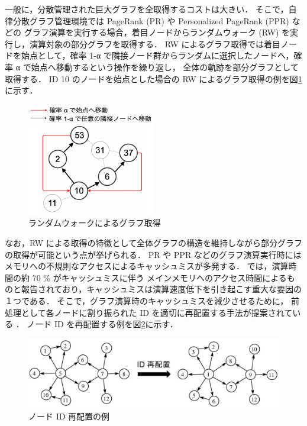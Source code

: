 一般に，分散管理された巨大グラフを全取得するコストは大きい．
そこで，自律分散グラフ管理環境では PageRank (PR) \cite{page1999pagerank} や Personalized PageRank (PPR) \cite{page1999pagerank} などの
グラフ演算を実行する場合，着目ノードからランダムウォーク (RW) を実行し，演算対象の部分グラフを取得する．
RW によるグラフ取得では着目ノードを始点として，確率 1-α で隣接ノード群からランダムに選択したノードへ，確率 α で始点へ移動するという操作を繰り返し，
全体の軌跡を部分グラフとして取得する．
ID 10 のノードを始点とした場合の RW によるグラフ取得の例を図\ref{RW_graph} に示す．
\begin{figure}[t]
  \centering
  \includegraphics[scale=1.8]{./figure/rw_graph_get.pdf}
  \caption{ランダムウォークによるグラフ取得}
  \label{RW_graph}
\end{figure}
なお，RW による取得の特徴として全体グラフの構造を維持しながら部分グラフの取得が可能という点が挙げられる．
PR や PPR などのグラフ演算実行時にはメモリへの不規則なアクセスによるキャッシュミスが多発する．
\cite{wei2016speedup,zhang2017making} では，演算時間の約 70 \% がキャッシュミスに伴う
メインメモリへのアクセス時間によるものと報告されており，キャッシュミスは演算速度低下を引き起こす重大な要因の１つである．
そこで，グラフ演算時のキャッシュミスを減少させるために，
前処理として各ノードに割り振られた ID を適切に再配置する手法が提案されている \cite{wei2016speedup,zhang2017making,balaji2018graph,arai2016rabbit,lakhotia2017recall,faldu2019closer}．
ノード ID を再配置する例を図\ref{reordering_intro}に示す．
\begin{figure}[t]
  \centering
  \includegraphics[width=\linewidth]{./figure/reordering_intro.pdf}
  \caption{ノード ID 再配置の例}
  \label{reordering_intro}
\end{figure}
